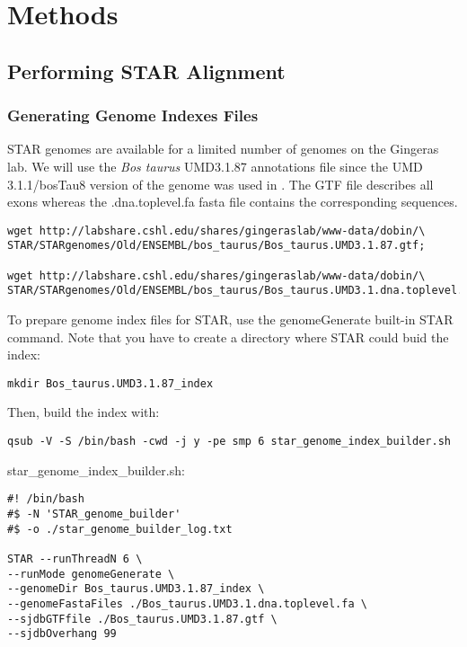

\section{Methods}



\subsection{Performing STAR Alignment}

\subsubsection{Generating Genome Indexes Files}

STAR genomes are available for a limited number of genomes on the Gingeras lab. We will use the \textit{Bos taurus} UMD3.1.87 annotations file since the UMD 3.1.1/bosTau8 version of the genome was used in \citep{Ariel2021}. The GTF file describes all exons whereas the .dna.toplevel.fa fasta file contains the corresponding sequences.



\begin{verbatim}
wget http://labshare.cshl.edu/shares/gingeraslab/www-data/dobin/\
STAR/STARgenomes/Old/ENSEMBL/bos_taurus/Bos_taurus.UMD3.1.87.gtf;

wget http://labshare.cshl.edu/shares/gingeraslab/www-data/dobin/\
STAR/STARgenomes/Old/ENSEMBL/bos_taurus/Bos_taurus.UMD3.1.dna.toplevel.fa;
\end{verbatim}

To prepare genome index files for STAR, use the genomeGenerate built-in STAR command.
Note that you have to create a directory where STAR could buid the index:

\begin{verbatim}
mkdir Bos_taurus.UMD3.1.87_index
\end{verbatim}

Then, build the index with:

\begin{verbatim}
qsub -V -S /bin/bash -cwd -j y -pe smp 6 star_genome_index_builder.sh
\end{verbatim}


\noindent star\_genome\_index\_builder.sh:
\begin{verbatim}
#! /bin/bash
#$ -N 'STAR_genome_builder'
#$ -o ./star_genome_builder_log.txt

STAR --runThreadN 6 \
--runMode genomeGenerate \
--genomeDir Bos_taurus.UMD3.1.87_index \
--genomeFastaFiles ./Bos_taurus.UMD3.1.dna.toplevel.fa \
--sjdbGTFfile ./Bos_taurus.UMD3.1.87.gtf \
--sjdbOverhang 99
\end{verbatim}



